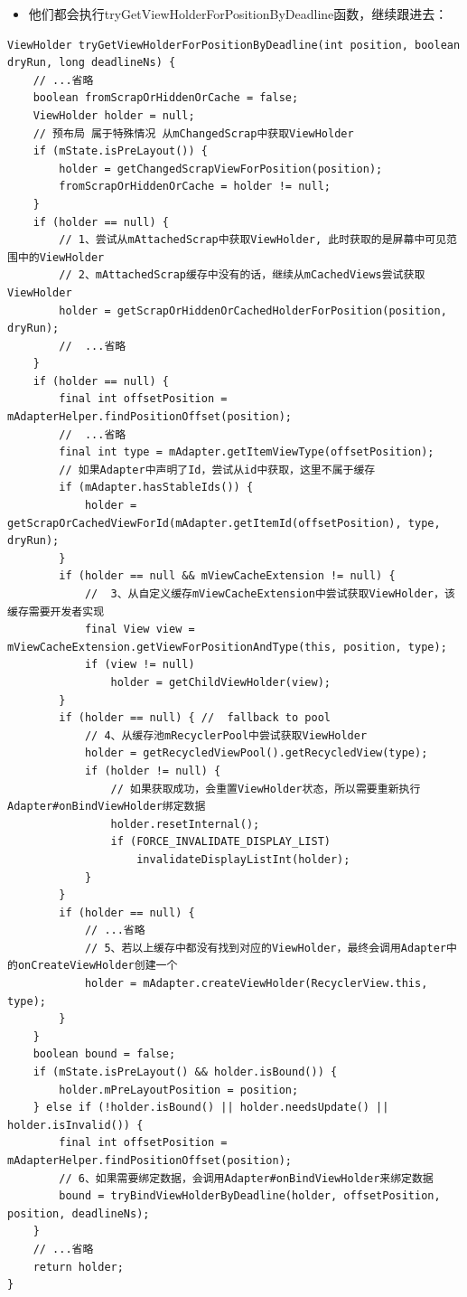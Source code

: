 \documentclass[9pt, b5paper]{article}
\begin{document}
\begin{itemize}
\item 他们都会执行tryGetViewHolderForPositionByDeadline函数，继续跟进去：
\end{itemize}
\begin{verbatim}
ViewHolder tryGetViewHolderForPositionByDeadline(int position, boolean dryRun, long deadlineNs) { 
    // ...省略     
    boolean fromScrapOrHiddenOrCache = false; 
    ViewHolder holder = null; 
    // 预布局 属于特殊情况 从mChangedScrap中获取ViewHolder 
    if (mState.isPreLayout()) { 
        holder = getChangedScrapViewForPosition(position); 
        fromScrapOrHiddenOrCache = holder != null; 
    } 
    if (holder == null) { 
        // 1、尝试从mAttachedScrap中获取ViewHolder, 此时获取的是屏幕中可见范围中的ViewHolder 
        // 2、mAttachedScrap缓存中没有的话，继续从mCachedViews尝试获取ViewHolder 
        holder = getScrapOrHiddenOrCachedHolderForPosition(position, dryRun); 
        //  ...省略 
    } 
    if (holder == null) { 
        final int offsetPosition = mAdapterHelper.findPositionOffset(position); 
        //  ...省略 
        final int type = mAdapter.getItemViewType(offsetPosition); 
        // 如果Adapter中声明了Id，尝试从id中获取，这里不属于缓存 
        if (mAdapter.hasStableIds()) { 
            holder = getScrapOrCachedViewForId(mAdapter.getItemId(offsetPosition), type, dryRun); 
        } 
        if (holder == null && mViewCacheExtension != null) { 
            //  3、从自定义缓存mViewCacheExtension中尝试获取ViewHolder，该缓存需要开发者实现 
            final View view = mViewCacheExtension.getViewForPositionAndType(this, position, type); 
            if (view != null) 
                holder = getChildViewHolder(view); 
        } 
        if (holder == null) { //  fallback to pool 
            // 4、从缓存池mRecyclerPool中尝试获取ViewHolder 
            holder = getRecycledViewPool().getRecycledView(type); 
            if (holder != null) { 
                // 如果获取成功，会重置ViewHolder状态，所以需要重新执行Adapter#onBindViewHolder绑定数据 
                holder.resetInternal(); 
                if (FORCE_INVALIDATE_DISPLAY_LIST) 
                    invalidateDisplayListInt(holder); 
            } 
        } 
        if (holder == null) { 
            // ...省略 
            // 5、若以上缓存中都没有找到对应的ViewHolder，最终会调用Adapter中的onCreateViewHolder创建一个 
            holder = mAdapter.createViewHolder(RecyclerView.this, type); 
        } 
    } 
    boolean bound = false; 
    if (mState.isPreLayout() && holder.isBound()) { 
        holder.mPreLayoutPosition = position; 
    } else if (!holder.isBound() || holder.needsUpdate() || holder.isInvalid()) { 
        final int offsetPosition = mAdapterHelper.findPositionOffset(position); 
        // 6、如果需要绑定数据，会调用Adapter#onBindViewHolder来绑定数据 
        bound = tryBindViewHolderByDeadline(holder, offsetPosition, position, deadlineNs); 
    } 
    // ...省略 
    return holder; 
}
\end{verbatim}
\end{document}
